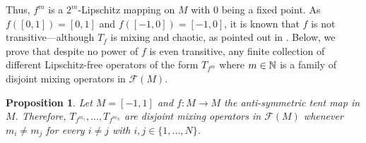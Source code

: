 \documentclass[11pt,reqno]{article}
\newtheorem{proposition}[statement]{Proposition}
\newcommand{\free}[1]{\mathcal{F}(#1)} %
\def\NN{\Bbb N}
\begin{document}
Thus, $f^m$ is a $2^m$-Lipschitz mapping on $M$ with $0$ being a fixed point. As $f([0,1])=[0,1]$ and $f([-1,0])=[-1,0]$, it is known that $f$ is not transitive---although $T_f$ is mixing and chaotic, as pointed out in \cite{ACP2021}. Below, we prove that despite no power of $f$ is even transitive, any finite collection of different Lipschitz-free operators of the form $T_{f^{m}}$ where $m\in \NN$ is a family of disjoint mixing operators in $\free{M}$. 

\begin{proposition}\label{prop:anti-sym-tent-map}
    Let $M=[-1,1]$ and $f\colon M\to M$ the anti-symmetric tent map in $M$. Therefore, $T_{f^{m_1}},...,T_{f^{m_N}}$ are disjoint mixing operators in $\free{M}$ whenever $m_i \neq m_j$ for every $i\neq j$ with $i,j\in \{1,...,N\}$.
\end{proposition}
\end{document}
